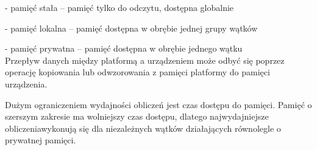 - pamięć stała – pamięć tylko do odczytu, dostępna globalnie

- pamięć lokalna – pamięć dostępna w obrębie jednej grupy wątków

- pamięć prywatna – pamięć dostępna w obrębie jednego wątku\\


 Przepływ danych między platformą  a urządzeniem może odbyć się poprzez operację kopiowania  lub odwzorowania z pamięci platformy do pamięci urządzenia.

Dużym ograniczeniem wydajności obliczeń jest czas dostępu do pamięci. Pamięć o szerszym zakresie ma wolniejszy czas dostępu, dlatego najwydajniejsze obliczeniawykonują się dla niezależnych wątków działających równolegle o prywatnej pamięci.















